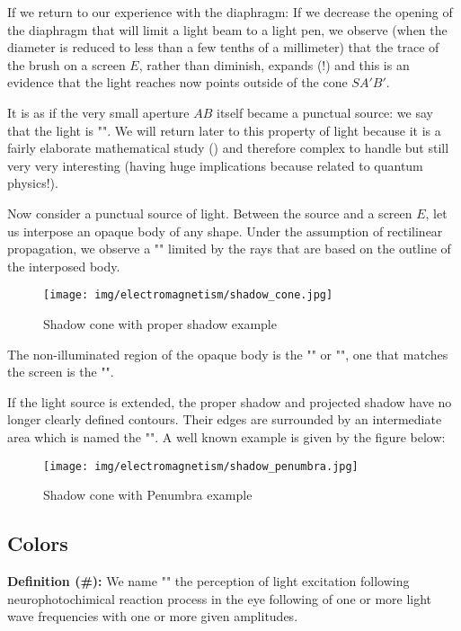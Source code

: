 	If we return to our experience with the diaphragm: If we decrease the opening of the diaphragm that will limit  a light beam to a light pen, we observe (when the diameter is reduced to less than a few tenths of a millimeter) that the trace of the brush on a screen $E$, rather than diminish, expands (!) and this is an evidence that the light reaches now points outside of the cone $SA'B'$.
	
	It is as if the very small aperture $AB$ itself became a punctual source: we say that the light is "". We will return later to this property of light because it is a fairly elaborate mathematical study () and therefore complex to handle but still very very interesting (having huge implications because related to quantum physics!).
	
	Now consider a punctual source of light. Between the source and a screen $E$, let us interpose an opaque body of any shape. Under the assumption of rectilinear propagation, we observe a "" limited by the rays that are based on the outline of the interposed body.
	\begin{figure}[H]
		\centering
		\texttt{[image: img/electromagnetism/shadow\_cone.jpg]}
		\caption{Shadow cone with proper shadow example}
	\end{figure}
	The non-illuminated region of the opaque body is the "" or "", one that matches the screen is the "".
	
	If the light source is extended, the proper shadow and projected shadow have no longer clearly defined contours. Their edges are surrounded by an intermediate area which is named the "". A well known example is given by the figure below:
	\begin{figure}[H]
		\centering
		\texttt{[image: img/electromagnetism/shadow\_penumbra.jpg]}
		\caption{Shadow cone with Penumbra example}
	\end{figure}
	
	\subsection{Colors}
	\textbf{Definition (\#\mydef):} We name "" the perception of light excitation following neurophotochimical reaction process in the eye following of one or more light wave frequencies with one or more given amplitudes.
	

